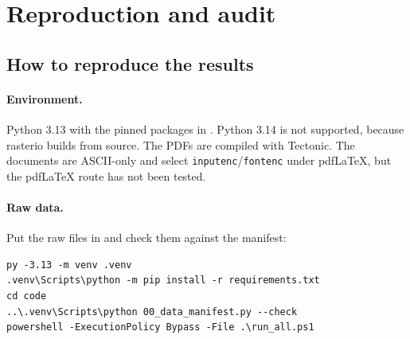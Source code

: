 \section{Reproduction and audit}\label{sec:repro}

\subsection{How to reproduce the results}
\paragraph{Environment.} Python 3.13 with the pinned packages in . Python 3.14 is not
supported, because rasterio builds from source. The PDFs are compiled with Tectonic. The documents are ASCII-only
and select \texttt{inputenc}/\texttt{fontenc} under pdfLaTeX, but the pdfLaTeX route has not been tested.

\paragraph{Raw data.} Put the raw files in  and check them against the manifest:
\begin{verbatim}
py -3.13 -m venv .venv
.venv\Scripts\python -m pip install -r requirements.txt
cd code
..\.venv\Scripts\python 00_data_manifest.py --check
powershell -ExecutionPolicy Bypass -File .\run_all.ps1
\end{verbatim}


